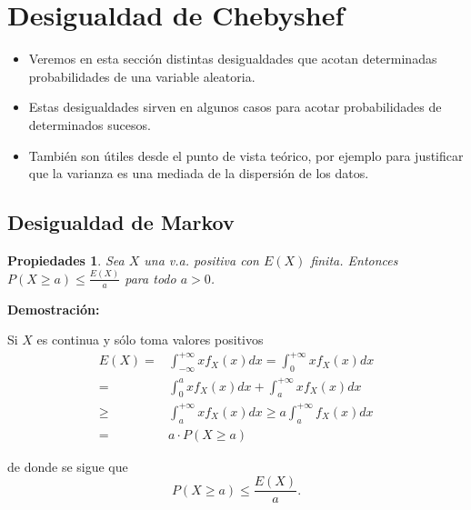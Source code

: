 \documentclass[handout]{beamer}\usepackage[]{graphicx}\usepackage[]{color}
\renewcommand{\leq}{\leqslant}
\renewcommand{\geq}{\geqslant}
\theoremstyle{plain}
\newtheorem{prop}{Propiedades}
\theoremstyle{definition}
\begin{document}
\section{Desigualdad de Chebyshef}
\begin{frame}


\begin{itemize}
\frametitle{Desigualdades de Markov y de Chebyshef}
\item Veremos en esta sección distintas desigualdades que acotan determinadas probabilidades de
una variable aleatoria.
\item Estas desigualdades sirven en algunos casos para acotar
probabilidades de determinados sucesos.
\item También son útiles desde el punto de vista
teórico, por ejemplo para justificar que la varianza es una mediada de la dispersión de
los datos.
\end{itemize}
\end{frame}

\subsection{Desigualdad de Markov}
\begin{frame}

\begin{prop}
Sea $X$ una v.a. positiva con $E(X)$ finita. Entonces
$P(X\geq a)\leq \frac{E(X)}{a}$ para todo $a>0$.
\end{prop}
\end{frame}

\begin{frame}

\textbf{Demostración: }

Si $X$ es continua  y sólo toma valores positivos\newline
\begin{equation*}
\begin{split}
E(X)=& \int_{-\infty}^{+\infty} x f_{X}(x) dx=  \int_{0}^{+\infty} x f_{X}(x) dx\\
= & \displaystyle \int_{0}^{a} x f_{X}(x)
dx+\int_{a}^{+\infty} x f_{X}(x) dx \\
\geq &  \int_{a}^{+\infty} x
f_{X}(x) dx \geq\displaystyle a \int_{a}^{+\infty}
f_{X}(x) dx\\
=& a\cdot  P(X\geq a)
\end{split}
\end{equation*}

de donde se sigue que  
$$P(X\geq a)\leq \frac{E(X)}{a}.$$
\end{frame}
\end{document}

